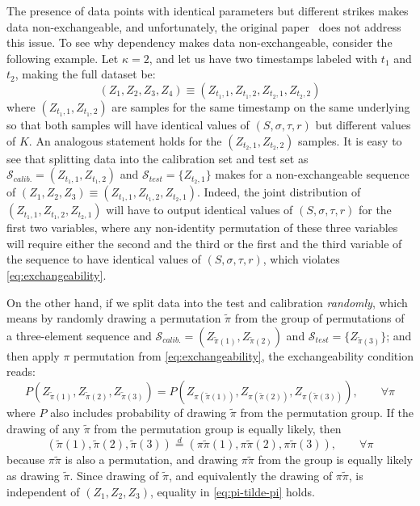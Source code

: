 \documentclass{article}
\theoremstyle{definition}
\begin{document}
The presence of data points with identical parameters but different strikes makes data non-exchangeable, and unfortunately, the original paper~\cite{bastos} does not address this issue. To see why dependency makes data non-exchangeable, consider the following example. Let $\kappa=2$, and let us have two timestamps labeled with $t_1$ and $t_2$, making the full dataset be:
$$
(Z_1, Z_2, Z_3, Z_4) \equiv (Z_{t_1, 1},Z_{t_1, 2},Z_{t_2, 1},Z_{t_2, 2})
$$
where $(Z_{t_1, 1}, Z_{t_1, 2})$ are samples for the same timestamp on the same underlying so that both samples will have identical values of $(S, \sigma, \tau, r)$ but different values of $K$. An analogous statement holds for the $(Z_{t_2, 1}, Z_{t_2, 2})$ samples. It is easy to see that splitting data into the calibration set and test set as $\mathcal{S}_{calib.} = (Z_{t_1, 1}, Z_{t_1, 2})$ and $\mathcal{S}_{test} = \{Z_{t_2, 1}\}$ makes for a non-exchangeable sequence of $(Z_1, Z_2, Z_3) \equiv (Z_{t_1, 1}, Z_{t_1, 2}, Z_{t_2, 1})$. Indeed, the joint distribution of $(Z_{t_1, 1}, Z_{t_1, 2}, Z_{t_2, 1})$ will have to output identical values of $(S, \sigma, \tau, r)$ for the first two variables, where any non-identity permutation of these three variables will require either the second and the third or the first and the third variable of the sequence to have identical values of $(S, \sigma, \tau, r)$, which violates \eqref{eq:exchangeability}.

On the other hand, if we split data into the test and calibration \emph{randomly}, which means by randomly drawing a permutation $\tilde \pi$ from the group of permutations of a three-element sequence and $\mathcal{S}_{calib.} = (Z_{\tilde{\pi}(1)}, Z_{\tilde{\pi}(2)})$ and $\mathcal{S}_{test} = \{Z_{\tilde{\pi}(3)}\}$; and then apply $\pi$ permutation from \eqref{eq:exchangeability}, the exchangeability condition reads:
\begin{equation}\label{eq:pi-tilde-pi}
    P(Z_{\tilde{\pi}(1)},Z_{\tilde{\pi}(2)}, Z_{\tilde{\pi}(3)}) = P(Z_{\pi(\tilde{\pi}(1))},Z_{\pi(\tilde{\pi}(2))}, Z_{\pi(\tilde{\pi}(3))}), \qquad \forall \pi
\end{equation}
where $P$ also includes probability of drawing $\tilde \pi$ from the permutation group. If the drawing of any $\tilde \pi$ from the permutation group is equally likely, then 
$$
(\tilde{\pi}(1), \tilde{\pi}(2), \tilde{\pi}(3)) \overset{d}{=}  (\pi\tilde{\pi}(1), \pi\tilde{\pi}(2), \pi\tilde{\pi}(3)), \qquad \forall \pi
$$
because $\pi\tilde{\pi}$ is also a permutation, and drawing $\pi\tilde{\pi}$ from the group is equally likely as drawing $\tilde{\pi}$. Since drawing of $\tilde{\pi}$, and equivalently the drawing of $\pi\tilde{\pi}$, is independent of $(Z_1, Z_2, Z_3)$, equality in \eqref{eq:pi-tilde-pi} holds.
\end{document}
